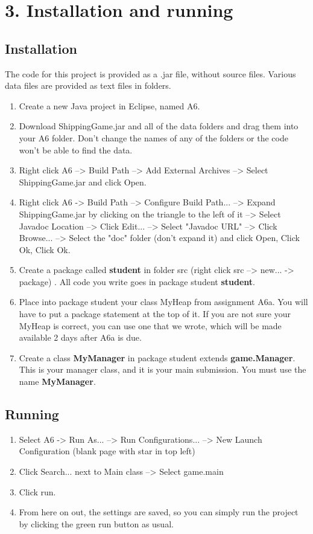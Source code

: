 \documentclass[11pt]{article}
\begin{document}
\section{3. Installation and running}
\subsection{Installation}
The code for this project is provided as a .jar file, without source files. Various data files are provided as text files in folders.
\begin{enumerate}
\item Create a new Java project in Eclipse, named A6.
\item Download ShippingGame.jar and all of the data folders and drag them into your A6 folder. Don't change the names of any of the folders or the code won't be able to find the data.
\item Right click A6 --> Build Path --> Add External Archives --> Select ShippingGame.jar and click Open.
\item Right click A6 -> Build Path --> Configure Build Path... --> Expand ShippingGame.jar by clicking on the triangle to the left of it --> Select Javadoc Location --> Click Edit... --> Select "Javadoc URL" --> Click Browse... --> Select the "doc" folder (don't expand it) and click Open, Click Ok, Click Ok.
\item Create a package called \textbf{student} in folder src (right click src --> new... -> package) . All code you write goes in package student \textbf{student}.
\item Place into package student your class MyHeap from assignment A6a. You will have to put a package statement at the top of it.
If you are not sure your MyHeap is correct, you can use one that we wrote, which will be made available 2 days after A6a is due.
\item Create a class \textbf{MyManager} in package student extends \textbf{game.Manager}. This is your manager class, and it is your main submission. You must use the name \textbf{MyManager}.
\end{enumerate}

\subsection{Running}
\begin{enumerate}
\item Select A6 -> Run As... --> Run Configurations... --> New Launch Configuration (blank page with star in top left)
\item Click Search... next to Main class --> Select game.main
\item Click run.
\item From here on out, the settings are saved, so you can simply run the project by clicking the green run button as usual.
\end{enumerate}
\end{document}
